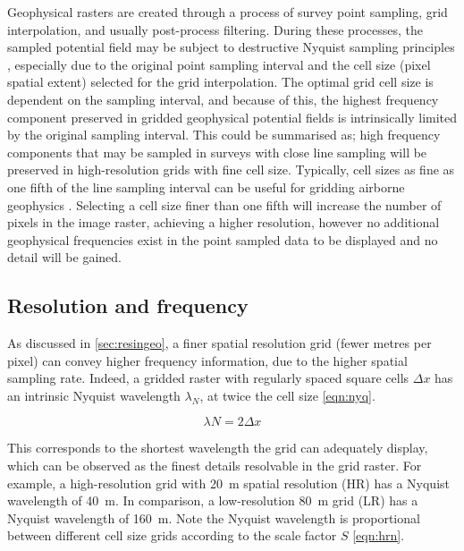 \documentclass[manuscript.tex]{subfiles}
\begin{document}
Geophysical rasters are created through a process of survey point sampling, grid interpolation, and usually post-process filtering.
During these processes, the sampled potential field may be subject to destructive Nyquist sampling principles \parencite[26]{dentithGeophysicsMineralExploration2014}, especially due to the original point sampling interval and the cell size (pixel spatial extent) selected for the grid interpolation.
The optimal grid cell size is dependent on the sampling interval, and because of this, the highest frequency component preserved in gridded geophysical potential fields is intrinsically limited by the original sampling interval.
This could be summarised as; high frequency components that may be sampled in surveys with close line sampling will be preserved in high-resolution grids with fine cell size.
Typically, cell sizes as fine as one fifth of the line sampling interval can be useful for gridding airborne geophysics \parencite{reidAeromagneticSurveyDesign1980}.
Selecting a cell size finer than one fifth will increase the number of pixels in the image raster, achieving a higher resolution, however no additional geophysical frequencies exist in the point sampled data to be displayed and no detail will be gained.

\subsection{Resolution and frequency}
As discussed in \cref{sec:resingeo}, a finer spatial resolution grid (fewer metres per pixel) can convey higher frequency information, due to the higher spatial sampling rate.
Indeed, a gridded raster with regularly spaced square cells \(\Delta x\) has an intrinsic Nyquist wavelength \(\lambda _N\), at twice the cell size \cref{eqn:nyq}.

\begin{equation}
    \label{eqn:nyq}
    \lambda{}N = 2 \Delta{}x
\end{equation}

This corresponds to the shortest wavelength the grid can adequately display, which can be observed as the finest details resolvable in the grid raster.
For example, a high-resolution grid with \SI{20}{\metre} spatial resolution (HR) has a Nyquist wavelength of \SI{40}{\metre}.
In comparison, a low-resolution \SI{80}{\metre} grid (LR) has a Nyquist wavelength of \SI{160}{\metre}.
Note the Nyquist wavelength is proportional between different cell size grids according to the scale factor \(S\) \cref{eqn:hrn}.
\end{document}
